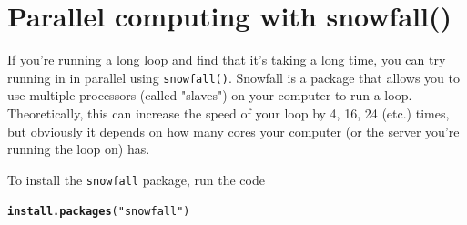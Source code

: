\documentclass{tufte-book}\usepackage[]{graphicx}\usepackage[]{color}
\makeatletter
\newcommand{\hlstr}[1]{\textcolor[rgb]{0.192,0.494,0.8}{#1}}%
\newcommand{\hlstd}[1]{\textcolor[rgb]{0.345,0.345,0.345}{#1}}%
\newcommand{\hlkwd}[1]{\textcolor[rgb]{0.737,0.353,0.396}{\textbf{#1}}}%
\newenvironment{kframe}{%
 \def\at@end@of@kframe{}%
 \ifinner\ifhmode%
  \def\at@end@of@kframe{\end{minipage}}%
  \begin{minipage}{\columnwidth}%
 \fi\fi%
 \def\FrameCommand##1{\hskip\@totalleftmargin \hskip-\fboxsep
 \colorbox{shadecolor}{##1}\hskip-\fboxsep
     \hskip-\linewidth \hskip-\@totalleftmargin \hskip\columnwidth}%
 \MakeFramed {\advance\hsize-\width
   \@totalleftmargin\z@ \linewidth\hsize
   \@setminipage}}%
 {\par\unskip\endMakeFramed%
 \at@end@of@kframe}
\newenvironment{knitrout}{}{} %
\makeatother
\begin{document}



\section{Parallel computing with snowfall()}

If you're running a long loop and find that it's taking a long time, you can try running in in parallel using \texttt{snowfall()}. Snowfall is a package that allows you to use multiple processors (called "slaves") on your computer to run a loop. Theoretically, this can increase the speed of your loop by 4, 16, 24 (etc.) times, but obviously it depends on how many cores your computer (or the server you're running the loop on) has.

To install the \texttt{snowfall} package, run the code

\begin{knitrout}
\color{fgcolor}\begin{kframe}
\begin{alltt}
\hlkwd{install.packages}\hlstd{(}\hlstr{"snowfall"}\hlstd{)}
\end{alltt}
\end{kframe}
\end{knitrout}
\end{document}
